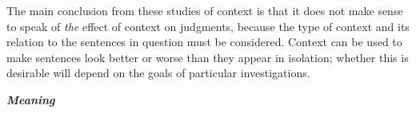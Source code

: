 \begin{styleStandard}
The main conclusion from these studies of context is that it does not make sense to speak of \textit{the}\textit{ }effect of context on judgments, because the type of context and its relation to the sentences in question must be considered. Context can be used to make sentences look better or worse than they appear in isolation; whether this is desirable will depend on the goals of particular investigations.
\end{styleStandard}


\setcounter{listWWNumxxiiileveli}{4}
\begin{listWWNumxxiiileveli}
\item 
\setcounter{listWWNumxxiiilevelii}{2}
\begin{listWWNumxxiiilevelii}
\item 
\setcounter{listWWNumxxiiileveliii}{1}
\begin{listWWNumxxiiileveliii}
\item 
\begin{styleStandard}
\textbf{\textit{Meaning}}
\end{styleStandard}


\end{listWWNumxxiiileveliii}
\end{listWWNumxxiiilevelii}
\end{listWWNumxxiiileveli}
